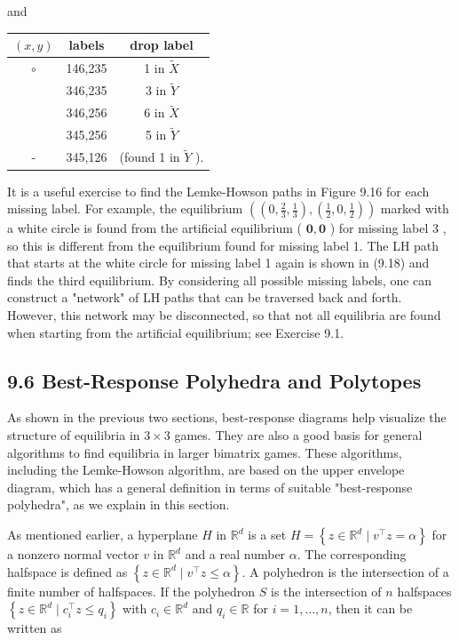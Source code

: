 \documentclass[12pt]{article}
\begin{document}
and

\begin{center}
\begin{tabular}{ccc}
$(x, y)$ & labels & drop label \\
\hline
$\circ$ & 146,235 & 1 in $\tilde{X}$ \\
 & 346,235 & 3 in $\tilde{Y}$ \\
 & 346,256 & 6 in $\tilde{X}$ \\
 & 345,256 & 5 in $\tilde{Y}$ \\
- & 345,126 & (found 1 in $\tilde{Y}$ ). \\
\end{tabular}
\end{center}

It is a useful exercise to find the Lemke-Howson paths in Figure 9.16 for each missing label. For example, the equilibrium $\left(\left(0, \frac{2}{3}, \frac{1}{3}\right),\left(\frac{1}{2}, 0, \frac{1}{2}\right)\right)$ marked with a white circle is found from the artificial equilibrium ( $\mathbf{0}, \mathbf{0}$ ) for missing label 3 , so this is different from the equilibrium found for missing label 1. The LH path that starts at the white circle for missing label 1 again is shown in (9.18) and finds the third equilibrium. By considering all possible missing labels, one can construct a "network" of LH paths that can be traversed back and forth. However, this network may be disconnected, so that not all equilibria are found when starting from the artificial equilibrium; see Exercise 9.1.

\subsection*{9.6 Best-Response Polyhedra and Polytopes}
As shown in the previous two sections, best-response diagrams help visualize the structure of equilibria in $3 \times 3$ games. They are also a good basis for general algorithms to find equilibria in larger bimatrix games. These algorithms, including the Lemke-Howson algorithm, are based on the upper envelope diagram, which has a general definition in terms of suitable "best-response polyhedra", as we explain in this section.

As mentioned earlier, a hyperplane $H$ in $\mathbb{R}^{d}$ is a set $H=\left\{z \in \mathbb{R}^{d} \mid v^{\top} z=\alpha\right\}$ for a nonzero normal vector $v$ in $\mathbb{R}^{d}$ and a real number $\alpha$. The corresponding halfspace is defined as $\left\{z \in \mathbb{R}^{d} \mid v^{\top} z \leq \alpha\right\}$. A polyhedron is the intersection of a finite number of halfspaces. If the polyhedron $S$ is the intersection of $n$ halfspaces $\left\{z \in \mathbb{R}^{d} \mid c_{i}^{\top} z \leq q_{i}\right\}$ with $c_{i} \in \mathbb{R}^{d}$ and $q_{i} \in \mathbb{R}$ for $i=1, \ldots, n$, then it can be written as
\end{document}
